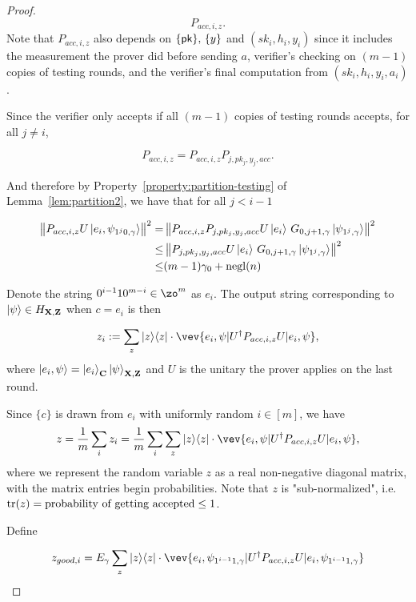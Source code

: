 \begin{proof}
$$P_{acc,i,z}.$$
Note that $P_{acc,i,z}$ also depends on $\{\mathsf{pk}\},\,\{y\}$ and  $(sk_i,h_i,y_i)$ since it includes the measurement the prover did before sending $a$,  verifier's checking on $(m-1)$ copies of testing rounds, and  the verifier's final computation from $(sk_i,h_i,y_i,a_i)$.

Since the verifier only accepts if all $(m-1)$ copies of testing rounds accepts, for all $j\neq i$,

$$P_{acc,i,z}=P_{acc,i,z}P_{j,pk_j,y_j,acc}.$$

And therefore by Property~\ref{property:partition-testing} of Lemma~\ref{lem:partition2}, we have that for all $j <i-1$

\begin{align} \label{eq:rejected-d}
    \left\lVert P_{acc,i,z} U \ket{e_i, \psi_{1^j0,\gamma}}\right\rVert^2
    =& \left\lVert P_{acc,i,z}P_{j,pk_j,y_j,acc} U \ket{e_i}\, G_{0,j+1,\gamma}\ket{\psi_{1^j,\gamma}}  \right\rVert^2 \nonumber \\
    \leq& \left\lVert P_{j,pk_j,y_j,acc} U \ket{e_i}\, G_{0,j+1,\gamma}\ket{\psi_{1^j,\gamma}}  \right\rVert^2 \nonumber \\
    \leq& (m-1)\gamma_0+\operatorname{negl}(n) 
\end{align}


Denote the string $0^{i-1}10^{m-i} \in \zo^m $ as $e_i$. The output string corresponding to $\ket{\psi} \in H_{\mathbf{X},\mathbf{Z}}$ when $c=e_i$ is then 




$$z_i\defeq \sum_z \proj{z} \cdot \vev{e_i,\psi|U^\dag P_{acc,i,z} U|e_i,\psi},$$
where $\ket{e_i,\psi}=\ket{e_i}_{\mathbf{C}}\ket{\psi}_{\mathbf{X},\mathbf{Z}}$ and $U$ is the unitary the prover applies on the last round.

Since $\{c\}$ is drawn  from $e_i$ with uniformly random $i\in [m]$, we have 
$$ z=\frac{1}{m} \sum_i z_i= \frac{1}{m} \sum_i \sum_z \proj{z} \cdot \vev{e_i,\psi|U^\dag P_{acc,i,z} U|e_i,\psi},$$ 
	where we represent the random variable $z$ as a real non-negative diagonal matrix, with the matrix entries begin  probabilities. Note that $z$ is "sub-normalized", i.e. $\operatorname{tr} (z)= \text{probability of getting accepted} \leq 1$.






Define 

\begin{align}
    z_{good,i}=E_\gamma \sum_z \proj{z} \cdot \vev{e_i,\psi_{1^{i-1}1,\gamma}|U^\dag P_{acc,i,z} U|e_i,\psi_{1^{i-1}1,\gamma}}
\end{align}


\end{proof}
